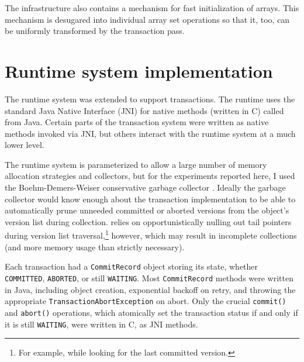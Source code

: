 The \flex infrastructure also contains a mechanism for fast
initialization of arrays.  This mechanism is desugared into
individual array set operations so that it, too, can be uniformly
transformed by the transaction pass.

\section{Runtime system implementation}
The \flex runtime system was extended to support transactions.  The
runtime uses the standard Java Native Interface (JNI) \cite{JNI} for
native methods (written in C) called from Java.  Certain parts of the
transaction system were written as native methods invoked via JNI, but
others interact with the runtime system at a much lower level.
  
The runtime system is parameterized to allow a large number of memory
allocation strategies and collectors, but for the experiments reported
here, I used the Boehm-Demers-Weiser conservative garbage collector
\cite{BoehmDeWe91}.
Ideally the garbage collector would know enough about the transaction
implementation to be able to automatically prune unneeded committed or
aborted versions from the object's version list during collection.
\Flex relies on opportunistically nulling out tail pointers
during version list traversal,\footnote{For example, while looking for the
last committed version.} however, which may result in incomplete collections
(and more memory usage than strictly necessary).

Each transaction had a \texttt{CommitRecord} object storing its state,
whether \texttt{COMMITTED}, \texttt{ABORTED}, or still
\texttt{WAITING}.  Most \texttt{CommitRecord} methods were written in
Java, including object creation, exponential backoff on retry, and
throwing the appropriate \texttt{TransactionAbortException} on abort.
Only the crucial \texttt{commit()} and \texttt{abort()} operations,
which atomically set the transaction status if and only if it is still
\texttt{WAITING}, were written in C, as JNI methods.

